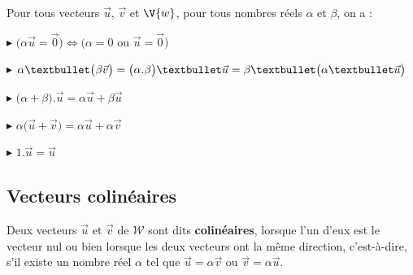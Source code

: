 \begin{propriete}[s]
Pour tous vecteurs $\vec{u}$, $\vec{v}$ et $\V{w}$, pour tous nombres réels $\alpha$ et $\beta$, on a :
\par \begin{minipage}{0.5\linewidth}
	\par $\blacktriangleright$ $\big(\alpha \vec{u}=\vec{0}\big)\iff \big(\alpha=0\text{ ou }\vec{u}=\vec{0}\big)$\\
	 \par$\blacktriangleright$ $\alpha\textbullet\big(\beta\vec{v}\big)=\big(\alpha.\beta\big)\textbullet\vec{u}=\beta\textbullet\big(\alpha\textbullet\vec{u}\big)$\\
	\par $\blacktriangleright$ $\big(\alpha+\beta\big).\vec{u}=\alpha\vec{u}+\beta\vec{u}$\\
	\par $\blacktriangleright$ $\alpha\big(\vec{u}+\vec{v}\big)=\alpha\vec{u}+\alpha\vec{v}$\\
	\par $\blacktriangleright$ $1.\vec{u}=\vec{u}$
\end{minipage}
\end{propriete}
\subsection{Vecteurs colinéaires}
\begin{definition}
Deux vecteurs $\vec{u}$ et $\vec{v}$ de $\mathcal{W}$ sont dits \textbf{colinéaires}, lorsque l'un d'eux est le vecteur nul ou bien lorsque les deux vecteurs ont la même direction, c'est-à-dire, s'il existe un nombre réel $\alpha$ tel que $\vec{u}=\alpha\vec{v}$ ou $\vec{v}=\alpha \vec{u}$. 
\end{definition}
